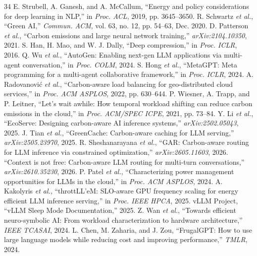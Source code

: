 \documentclass[10pt,twocolumn,letterpaper]{article}
\begin{document}
\begin{thebibliography}{34}\scriptsize\setlength{\itemsep}{2.2pt}\setlength{\parskip}{0pt}
 E. Strubell, A. Ganesh, and A. McCallum, ``Energy and policy considerations for deep learning in NLP,'' in \emph{Proc. ACL}, 2019, pp. 3645--3650.
 R. Schwartz \emph{et al.}, ``Green AI,'' \emph{Commun. ACM}, vol. 63, no. 12, pp. 54--63, Dec. 2020.
 D. Patterson \emph{et al.}, ``Carbon emissions and large neural network training,'' \emph{arXiv:2104.10350}, 2021.
 S. Han, H. Mao, and W. J. Dally, ``Deep compression,'' in \emph{Proc. ICLR}, 2016.
 Q. Wu \emph{et al.}, ``AutoGen: Enabling next-gen LLM applications via multi-agent conversation,'' in \emph{Proc. COLM}, 2024.
 S. Hong \emph{et al.}, ``MetaGPT: Meta programming for a multi-agent collaborative framework,'' in \emph{Proc. ICLR}, 2024.
 A. Radovanovi\'c \emph{et al.}, ``Carbon-aware load balancing for geo-distributed cloud services,'' in \emph{Proc. ACM ASPLOS}, 2022, pp. 630--644.
 P. Wiesner, A. Trapp, and P. Leitner, ``Let's wait awhile: How temporal workload shifting can reduce carbon emissions in the cloud,'' in \emph{Proc. ACM/SPEC ICPE}, 2021, pp. 73--84.
 Y. Li \emph{et al.}, ``EcoServe: Designing carbon-aware AI inference systems,'' \emph{arXiv:2502.05043}, 2025.
 J. Tian \emph{et al.}, ``GreenCache: Carbon-aware caching for LLM serving,'' \emph{arXiv:2505.23970}, 2025.
 R. Sheshanarayana \emph{et al.}, ``GAR: Carbon-aware routing for LLM inference via constrained optimization,'' \emph{arXiv:2605.11603}, 2026.
 ``Context is not free: Carbon-aware LLM routing for multi-turn conversations,'' \emph{arXiv:2610.35230}, 2026.
 P. Patel \emph{et al.}, ``Characterizing power management opportunities for LLMs in the cloud,'' in \emph{Proc. ACM ASPLOS}, 2024.
 A. Kakolyris \emph{et al.}, ``throttLL'eM: SLO-aware GPU frequency scaling for energy efficient LLM inference serving,'' in \emph{Proc. IEEE HPCA}, 2025.
 vLLM Project, ``vLLM Sleep Mode Documentation,'' 2025.
 Z. Wan \emph{et al.}, ``Towards efficient neuro-symbolic AI: From workload characterization to hardware architecture,'' \emph{IEEE TCASAI}, 2024.
 L. Chen, M. Zaharia, and J. Zou, ``FrugalGPT: How to use large language models while reducing cost and improving performance,'' \emph{TMLR}, 2024.

\end{thebibliography}
\end{document}
